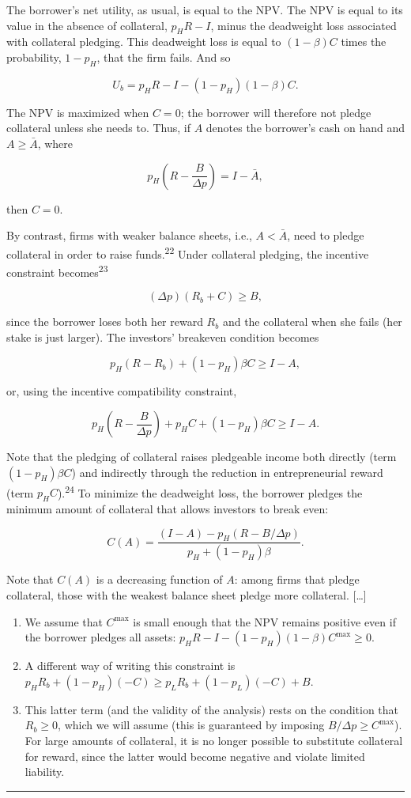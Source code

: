 \documentclass[11pt,a4paper]{article}
\newcommand{\stmtend}{\par\endgroup\nopagebreak\noindent\rule{\linewidth}{0.4pt}\par\medskip}
\begin{document}
The borrower's net utility, as usual, is equal to the NPV. The NPV is equal to its value in the
absence of collateral, \(p_H R - I\), minus the deadweight loss associated with collateral pledging.
This deadweight loss is equal to \((1 - \beta)C\) times the probability, \(1 - p_H\), that the firm
fails. And so

\[U_b = p_H R - I - (1 - p_H)(1 - \beta)C.\]

The NPV is maximized when \(C = 0\); the borrower will therefore not pledge collateral unless she
needs to. Thus, if \(A\) denotes the borrower's cash on hand and \(A \geqslant \bar A\), where

\[p_H\left(R - \frac{B}{\Delta p}\right) = I - \bar A,\]

then \(C = 0\).

By contrast, firms with weaker balance sheets, i.e., \(A < \bar A\), need to pledge collateral in
order to raise funds.\textsuperscript{22} Under collateral pledging, the incentive constraint
becomes\textsuperscript{23}

\[(\Delta p)(R_b + C) \geqslant B,\]

since the borrower loses both her reward \(R_b\) and the collateral when she fails (her stake is
just larger). The investors' breakeven condition becomes

\[p_H(R - R_b) + (1 - p_H)\beta C \geqslant I - A,\]

or, using the incentive compatibility constraint,

\[p_H\left(R - \frac{B}{\Delta p}\right) + p_H C + (1 - p_H)\beta C \geqslant I - A.\]

Note that the pledging of collateral raises pledgeable income both directly (term
\((1 - p_H)\beta C\)) and indirectly through the reduction in entrepreneurial reward (term
\(p_H C\)).\textsuperscript{24} To minimize the deadweight loss, the borrower pledges the minimum
amount of collateral that allows investors to break even:

\[C(A) = \frac{(I - A) - p_H(R - B/\Delta p)}{p_H + (1 - p_H)\beta}.\]

Note that \(C(A)\) is a decreasing function of \(A\): among firms that pledge collateral, those with
the weakest balance sheet pledge more collateral. {[}\ldots{]}

\begin{enumerate}
\def\labelenumi{\arabic{enumi}.}
\setcounter{enumi}{21}
\item
  We assume that \(C^{\max}\) is small enough that the NPV remains positive even if the borrower
  pledges all assets: \(p_H R - I - (1 - p_H)(1 - \beta)C^{\max} \geqslant 0\).
\item
  A different way of writing this constraint is
  \(p_H R_b + (1 - p_H)(-C) \geqslant p_L R_b + (1 - p_L)(-C) + B\).
\item
  This latter term (and the validity of the analysis) rests on the condition that
  \(R_b \geqslant 0\), which we will assume (this is guaranteed by imposing
  \(B/\Delta p \geqslant C^{\max}\)). For large amounts of collateral, it is no longer possible to
  substitute collateral for reward, since the latter would become negative and violate limited
  liability.
\end{enumerate}
\stmtend
\end{document}
